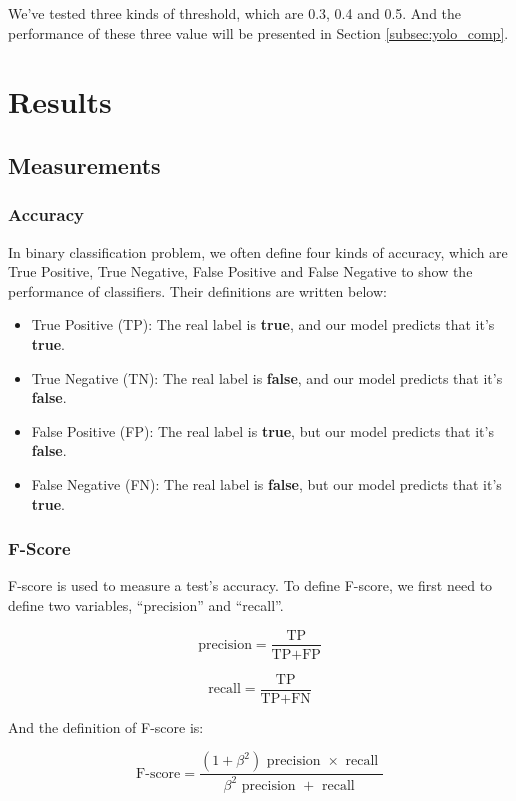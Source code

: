\documentclass{article}[12pt, twocolumn]
\begin{document}
We've tested three kinds of threshold, which are 0.3, 0.4 and 0.5. And the performance of these
three value will be presented in Section \ref{subsec:yolo_comp}.

\section{Results} \label{sec:res}
\subsection{Measurements}
\subsubsection{Accuracy}
In binary classification problem, we often define four kinds of accuracy, 
which are True Positive, True Negative, False Positive and False Negative 
to show the performance of classifiers. Their definitions are written below:
\begin{itemize}
    \item True Positive (TP): The real label is \textbf{true}, 
    and our model predicts that it's \textbf{true}.
    \item True Negative (TN): The real label is \textbf{false}, 
    and our model predicts that it's \textbf{false}.
    \item False Positive (FP): The real label is \textbf{true}, 
    but our model predicts that it's \textbf{false}.
    \item False Negative (FN): The real label is \textbf{false}, 
    but our model predicts that it's \textbf{true}.
\end{itemize}
\subsubsection{F-Score}
F-score is used to measure a test's accuracy. 
To define F-score, we first need to define two variables, 
``precision'' and ``recall''.

\begin{equation}
    \text {precision}=\frac{\text{TP}}{\text{TP}+\text{FP}}
\end{equation}

\begin{equation}
    \text {recall}=\frac{\text{TP}}{\text{TP}+\text{FN}}
\end{equation}

And the definition of F-score is:

\begin{equation}
    \text {F-score}=\frac{\left(1+\beta^{2}\right) \text { precision } \times \text { recall }}{\beta^{2} \text { precision }+\text { recall }}
\end{equation}
\end{document}
